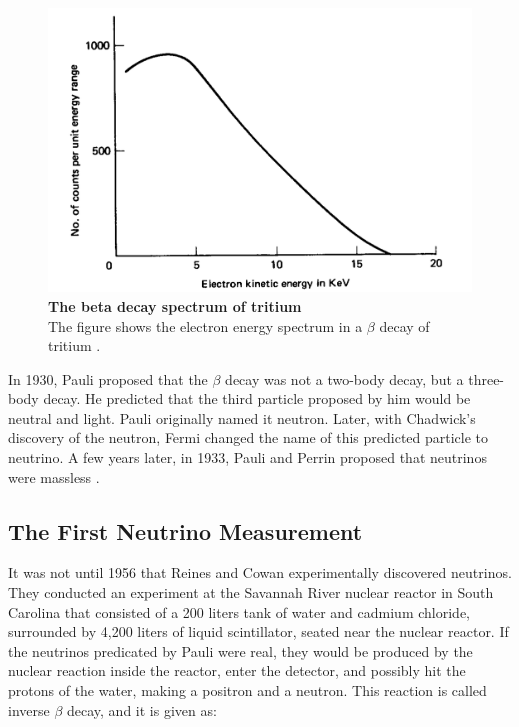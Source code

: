 \begin{figure}[h!]
	\begin{center}
		\includegraphics[scale=0.3]{Figures/electron_beta_decay_spectrum.pdf}
		\caption[The $\beta$ decay spectrum of tritium]{ {\textbf{The beta decay spectrum of tritium}} \\The figure shows the electron energy spectrum in a $\beta$ decay of tritium \cite{griffiths}.}
		\label{figure_the_beta_decay_spectrum_of_tritium}	
	\end{center}
\end{figure}

In 1930, Pauli proposed that the $\beta$ decay was not a two-body decay, but a three-body decay. He predicted that the third particle proposed by him would be neutral and light. Pauli originally named it neutron. Later, with Chadwick's discovery of the neutron, Fermi changed the name of this predicted particle to neutrino. A few years later, in 1933, Pauli and Perrin proposed that neutrinos were massless \cite{griffiths}.

\subsection{The First Neutrino Measurement}
It was not until 1956 that Reines and Cowan experimentally discovered neutrinos. They conducted an experiment at the Savannah River nuclear reactor in South Carolina that consisted of a 200 liters tank of water and cadmium chloride, surrounded by 4,200 liters of liquid scintillator, seated near the nuclear reactor. If the neutrinos predicated by Pauli were real, they would be produced by the nuclear reaction inside the reactor, enter the detector, and possibly hit the protons of the water, making a positron and a neutron. This reaction is called inverse $\beta$ decay, and it is given as:

